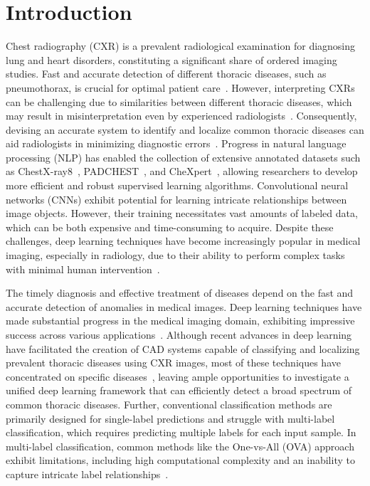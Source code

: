 \section{Introduction}
Chest radiography (CXR) is a prevalent radiological examination for diagnosing lung and heart disorders, constituting a significant share of ordered imaging studies. Fast and accurate detection of different thoracic diseases, such as pneumothorax, is crucial for optimal patient care~\cite{bellaviti_Increased_2016}. However, interpreting CXRs can be challenging due to similarities between different thoracic diseases, which may result in misinterpretation even by experienced radiologists~\cite{delrue_Difficulties_2011}. Consequently, devising an accurate system to identify and localize common thoracic diseases can aid radiologists in minimizing diagnostic errors~\cite{crisp_Global_2014,silverstein_Most_2016}.
Progress in natural language processing (NLP) has enabled the collection of extensive annotated datasets such as ChestX-ray8~\cite{wang_ChestXRay8_2017}, PADCHEST~\cite{bustos_Padchest_2020}, and CheXpert~\cite{irvin_CheXpert_2019}, allowing researchers to develop more efficient and robust supervised learning algorithms.
Convolutional neural networks (CNNs) exhibit potential for learning intricate relationships between image objects. However, their training necessitates vast amounts of labeled data, which can be both expensive and time-consuming to acquire. Despite these challenges, deep learning techniques have become increasingly popular in medical imaging, especially in radiology, due to their ability to perform complex tasks with minimal human intervention~\cite{jaderberg_Spatial_2015}.

The timely diagnosis and effective treatment of diseases depend on the fast and accurate detection of anomalies in medical images. Deep learning techniques have made substantial progress in the medical imaging domain, exhibiting impressive success across various applications~\cite{litjens_Survey_2017a,eshghali_Machine_2023}.  Although recent advances in deep learning have facilitated the creation of CAD systems capable of classifying and localizing prevalent thoracic diseases using CXR images, most of these techniques have concentrated on specific diseases~\cite{jaiswal_Identifying_2019,lakhani_Deep_2017,pasa_Efficient_2019,ausawalaithong_Automatic_2018}, leaving ample opportunities to investigate a unified deep learning framework that can efficiently detect a broad spectrum of common thoracic diseases. Further, conventional classification methods are primarily designed for single-label predictions and struggle with multi-label classification, which requires predicting multiple labels for each input sample. In multi-label classification, common methods like the One-vs-All (OVA) approach exhibit limitations, including high computational complexity and an inability to capture intricate label relationships~\cite{tsoumakas_MultiLabel_2007}.

